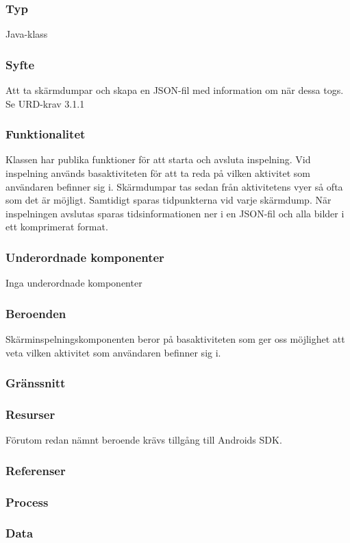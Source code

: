 \subsubsection{Typ}
Java-klass
\subsubsection{Syfte}
Att ta skärmdumpar och skapa en JSON-fil med information om när dessa togs.
Se URD-krav 3.1.1
\subsubsection{Funktionalitet}
Klassen har publika funktioner för att starta och avsluta inspelning. Vid inspelning används basaktiviteten för att ta reda på vilken aktivitet som användaren befinner sig i. Skärmdumpar tas sedan från aktivitetens vyer så ofta som det är möjligt. Samtidigt sparas tidpunkterna vid varje skärmdump. När inspelningen avslutas sparas tidsinformationen ner i en JSON-fil och alla bilder i ett komprimerat format.
\subsubsection{Underordnade komponenter}
Inga underordnade komponenter
\subsubsection{Beroenden}
Skärminspelningskomponenten beror på basaktiviteten som ger oss möjlighet att veta vilken aktivitet som användaren befinner sig i.
\subsubsection{Gränssnitt}

\subsubsection{Resurser}
Förutom redan nämnt beroende krävs tillgång till Androids SDK.
\subsubsection{Referenser}

\subsubsection{Process}

\subsubsection{Data}
